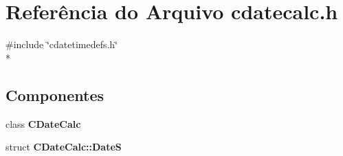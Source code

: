 \section{Referência do Arquivo cdatecalc.\+h}
\label{cdatecalc_8h}
{\ttfamily \#include \char`\"{}cdatetimedefs.\+h\char`\"{}}\\*
\subsection*{Componentes}
\begin{DoxyCompactItemize}
\item 
class {\bf C\+Date\+Calc}
\item 
struct {\bf C\+Date\+Calc\+::\+DateS}
\end{DoxyCompactItemize}
